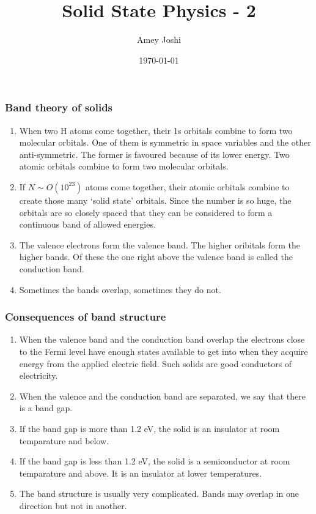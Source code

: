 \documentclass{beamer}
\title{Solid State Physics - 2}
\author{Amey Joshi}
\date{\today}
\begin{document}
\begin{frame}
\titlepage
\end{frame}

\begin{frame}
\frametitle{Band theory of solids}
\begin{enumerate}
\item When two H atoms come together, their 1s orbitals combine to form two 
molecular orbitals. One of them is symmetric in space variables and the other
anti-symmetric. The former is favoured because of its lower energy. Two atomic
orbitals combine to form two molecular orbitals.
\item If $N \sim O(10^{23})$ atoms come together, their atomic orbitals combine
to create those many `solid state' orbitals. Since the number is so huge, the 
orbitals are so closely spaced that they can be considered to form a continuous
band of allowed energies.
\item The valence electrons form the valence band. The higher oribitals form the
higher bands. Of these the one right above the valence band is called the 
conduction band.
\item Sometimes the bands overlap, sometimes they do not.
\end{enumerate}
\end{frame}

\begin{frame}
\frametitle{Consequences of band structure}
\begin{enumerate}
\item When the valence band and the conduction band overlap the electrons close
to the Fermi level have enough states available to get into when they acquire
energy from the applied electric field. Such solids are good conductors of 
electricity.
\item When the valence and the conduction band are separated, we say that there
is a band gap.
\item If the band gap is more than 1.2 eV, the solid is an insulator at room
temparature and below.
\item If the band gap is less than 1.2 eV, the solid is a semiconductor at room
temparature and above. It is an insulator at lower temperatures.
\item The band structure is usually very complicated. Bands may overlap in one
direction but not in another.
\end{enumerate}
\end{frame}
\end{document}
